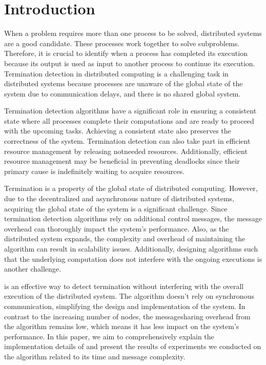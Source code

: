 \documentclass[letterpaper,10pt,english]{sphinxmanual}
\begin{document}
\section{Introduction}
\label{\detokenize{docs/ShavitFrancez/introduction:introduction}}\label{\detokenize{docs/ShavitFrancez/introduction::doc}}
\sphinxAtStartPar
When a problem requires more than one process to be solved, distributed systems are a good candidate. These processes work together to solve subproblems. Therefore, it is crucial to identify when a process has completed its execution because its output is used as input to another process to continue its execution. Termination detection in distributed computing is a challenging task in distributed systems because processes are unaware of the global state of the system due to communication delays, and there is no shared global system.

\sphinxAtStartPar
Termination detection algorithms have a significant role in ensuring a consistent state where all processes complete their computations and are ready to proceed with the upcoming tasks. Achieving a consistent state also preserves the correctness of the system. Termination detection can also take part in efficient resource management by releasing not\sphinxhyphen{}needed resources. Additionally, efficient resource management may be beneficial in preventing deadlocks since their primary cause is indefinitely waiting to acquire resources.

\sphinxAtStartPar
Termination is a property of the global state of distributed computing. However, due to the decentralized and asynchronous nature of distributed systems, acquiring the global state of the system is a significant challenge. Since termination detection algorithms rely on additional control messages, the message overhead can thoroughly impact the system’s performance. Also, as the distributed system expands, the complexity and overhead of maintaining the algorithm can result in scalability issues. Additionally, designing algorithms such that the underlying computation does not interfere with the ongoing executions is another challenge.

\sphinxAtStartPar
{\hyperref[\detokenize{docs/ShavitFrancez/algorithm:shavitfrancezterminationdetectionalgorithm}]{}} is an effective way to detect termination without interfering with the overall execution of the distributed system. The algorithm doesn’t rely on synchronous communication, simplifying the design and implementation of the system. In contrast to the increasing number of nodes, the message\sphinxhyphen{}sharing overhead from the algorithm remains low, which means it has less impact on the system’s performance. In this paper, we aim to comprehensively explain the implementation details of {\hyperref[\detokenize{docs/ShavitFrancez/algorithm:shavitfrancezterminationdetectionalgorithm}]{}} and present the results of experiments we conducted on the algorithm related to its time and message complexity.
\end{document}
